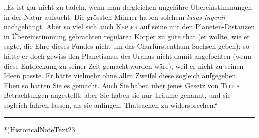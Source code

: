 „Es ist gar nicht zu tadeln, wenn man dergleichen ungefähre Übereinstimmungen in der Natur aufsucht. Die grössten Männer haben solchem \textit{lusus ingenii} nachgehängt. Aber so viel sich auch \textsc{Kepler} auf seine mit den Planeten-Distanzen in Übereinstimmung gebrachten regulären Körper zu gute that (er wollte, wie er sagte, die Ehre dieses Fundes nicht um das Churfürstenthum Sachsen geben): so hätte er doch gewiss den Planetismus des Uranus nicht damit angefochten (wenn diese Entdeckung zu seiner Zeit gemacht worden wäre), weil er nicht zu seinen Ideen passte. Er hätte vielmehr ohne allen Zweifel diese sogleich aufgegeben. Eben so hatten Sie es gemacht. Auch Sie haben über jenes Gesetz von \textsc{Titius} Betrachtungen angestellt; aber Sie haben sie nur Träume genannt, und sie sogleich fahren lassen, als sie anfingen, Thatsachen zu widersprechen.“
\par\nobreak\smallskip
\noindent\rule{.24\linewidth}{.3pt}\par\nobreak\smallskip
{\footnotesize\indent\hypertarget{native-236-note}{}*)\enspace\csname HistoricalNoteText23\endcsname\par}
\begin{flushright}\end{flushright}

